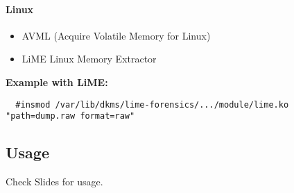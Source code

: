 \paragraph{Linux}
\begin{itemize}
  \item AVML (Acquire Volatile Memory for Linux)
  \item LiME Linux Memory Extractor
\end{itemize}
\textbf{Example with LiME:}
\begin{lstlisting}
  #insmod /var/lib/dkms/lime-forensics/.../module/lime.ko "path=dump.raw format=raw"
\end{lstlisting}

\subsection{Usage}
Check Slides for usage.